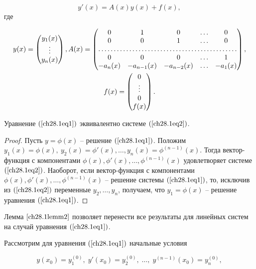 \begin{equation} \label{ch28.1eq2}
y'(x) = A(x)y(x) + f(x),
\end{equation}
где

\begin{multline}
y(x) = \begin{pmatrix}
y_1(x) \\
\vdots \\
y_n(x)
\end{pmatrix},
A(x) = \begin{pmatrix}
0 & 1 & 0 & \ldots & 0 \\
0 & 0 & 1 & \ldots & 0 \\
\hdotsfor{5} \\
0 & 0 & 0 & \ldots & 1 \\
-a_n(x) & -a_{n - 1}(x) & -a_{n - 2}(x) & \ldots & -a_1(x)
\end{pmatrix}, \\
f(x) = \begin{pmatrix}
0 \\
\vdots \\ 
0 \\
f(x)
\end{pmatrix}.
\end{multline}

\begin{lemm} \label{ch28.1lemm2}
Уравнение $(\ref{ch28.1eq1})$ эквивалентно системе $(\ref{ch28.1eq2})$.
\end{lemm}

\begin{proof}
Пусть $y = \phi(x)$ -- решение $(\ref{ch28.1eq1})$. Положим $y_1(x) = \phi(x), \: y_2(x) = \phi'(x), \ldots, y_n(x) = \phi^{(n - 1)}(x)$. Тогда вектор-функция с компонентами $\phi(x), \phi'(x), \ldots, \phi^{(n - 1)}(x)$ удовлетворяет системе $(\ref{ch28.1eq2})$. Наоборот, если вектор-функция с компонентами $\phi(x), \phi'(x), \ldots, \phi^{(n - 1)}(x)$ -- решение системы $(\ref{ch28.1eq1})$, то, исключив из $(\ref{ch28.1eq2})$ переменные $y_2, \ldots, y_n$, получаем, что $y_1 = \phi(x)$ -- решение уравнения $(\ref{ch28.1eq1})$.
\end{proof}

Лемма $\ref{ch28.1lemm2}$ позволяет  перенести все результаты для линейных систем на случай уравнения $(\ref{ch28.1eq1})$.

Рассмотрим для уравнения $(\ref{ch28.1eq1})$ начальные условия

\begin{equation} \label{ch28.1eq3}
y(x_0) = y_1^{(0)}, \; y'(x_0) = y_2^{(0)}, \; \ldots, \; y^{(n - 1)}(x_0) = y_n^{(0)},
\end{equation}

